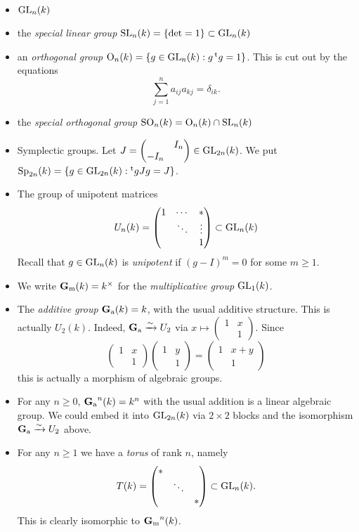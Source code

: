 \begin{itemize}
  \item $\operatorname{GL}_n(k)$ 
  \item the \emph{special linear group} $\operatorname{SL}_n(k)=\{\det=1\}\subset \operatorname{GL}_n(k)$
  \item an \emph{orthogonal group} 
    $\operatorname{O}_n(k)=\{g\in \operatorname{GL}_n(k):g \prescript{\mathrm{t}}{}{g}=1\}$. This is cut 
    out by the equations 
    \[
      \sum_{j=1}^n a_{i j} a_{k j} = \delta_{i k} .
    \]
  \item the \emph{special orthogonal group} $\operatorname{SO}_n(k)=\operatorname{O}_n(k)\cap \operatorname{SL}_n(k)$
  \item Symplectic groups. Let $J=\begin{pmatrix} & I_n \\ -I_n \end{pmatrix}\in \operatorname{GL}_{2n}(k)$. We put $\operatorname{Sp}_{2n}(k)=\{g\in \operatorname{GL}_{2n}(k):\prescript{\mathrm{t}}{}{g} J g=J\}$. 
  \item The group of unipotent matrices 
    \[
      U_n(k) = \begin{pmatrix} 1 & \cdots & \ast \\ & \ddots & \vdots \\ & & 1 \end{pmatrix} \subset \operatorname{GL}_n(k)
    \]
    Recall that $g\in \operatorname{GL}_n(k)$ is \emph{unipotent} if $(g-I)^m=0$ for some 
    $m\geqslant 1$. 
  \item We write $\operatorname{\mathbf{G}_m}(k)=k^\times$ for the \emph{multiplicative group} 
    $\operatorname{GL}_1(k)$. 
  \item The \emph{additive group} $\operatorname{\mathbf{G}_a}(k)=k$, with the usual additive structure. 
    This is actually $U_2(k)$. Indeed, $\operatorname{\mathbf{G}_a}\xrightarrow\sim U_2$ via 
    $x\mapsto \begin{pmatrix} 1 & x \\ & 1 \end{pmatrix}$. Since 
    \[
      \begin{pmatrix} 1 & x \\ & 1 \end{pmatrix} \begin{pmatrix} 1 & y \\ & 1 \end{pmatrix} = \begin{pmatrix} 1 & x+y \\ & 1 \end{pmatrix}
    \]
    this is actually a morphism of algebraic groups. 
  \item For any $n\geqslant 0$, $\operatorname{\mathbf{G}_a}^n(k)=k^n$ with the usual addition is a 
    linear algebraic group. We could embed it into $\operatorname{GL}_{2n}(k)$ via $2\times 2$ blocks 
    and the isomorphism $\operatorname{\mathbf{G}_a}\xrightarrow\sim U_2$ above.
  \item For any $n\geqslant 1$ we have a \emph{torus} of rank $n$, namely 
    \[
      T(k) = \begin{pmatrix} \ast \\ & \ddots \\ & & \ast \end{pmatrix}\subset \operatorname{GL}_n(k) .
    \]
    This is clearly isomorphic to $\operatorname{\mathbf{G}_m}^n(k)$.  
\end{itemize}

